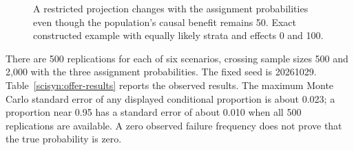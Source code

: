 \begin{figure}[htbp]
\centering
{}
\caption{A restricted projection changes with the assignment probabilities
even though the population's causal benefit remains 50. Exact constructed
example with equally likely strata and effects 0 and 100.}
\label{scisyn:projection-figure}
\end{figure}

There are 500 replications for each of six scenarios, crossing sample sizes
500 and 2,000 with the three assignment probabilities. The fixed seed is
20261029. Table~\ref{scisyn:offer-results} reports the observed results.
The maximum Monte Carlo standard error of any displayed conditional proportion
is about 0.023; a proportion near 0.95 has a standard error of about 0.010 when
all 500 replications are available. A zero observed failure frequency does not
prove that the true probability is zero.



